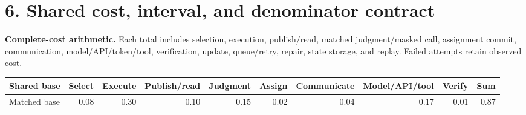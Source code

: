 \documentclass[10pt,a4paper,landscape]{article}
\begin{document}
\section*{6. Shared cost, interval, and denominator contract}
\textbf{Complete-cost arithmetic.} Each total includes selection, execution, publish/read, matched judgment/masked call, assignment commit, communication, model/API/token/tool, verification, update, queue/retry, repair, state storage, and replay. Failed attempts retain observed cost.
\begin{center}\scriptsize\begin{tabular}{lrrrrrrrrr}\toprule Shared base & Select & Execute & Publish/read & Judgment & Assign & Communicate & Model/API/tool & Verify & Sum \\\midrule Matched base & 0.08 & 0.30 & 0.10 & 0.15 & 0.02 & 0.04 & 0.17 & 0.01 & 0.87 \\\bottomrule\end{tabular}\end{center}
\end{document}
